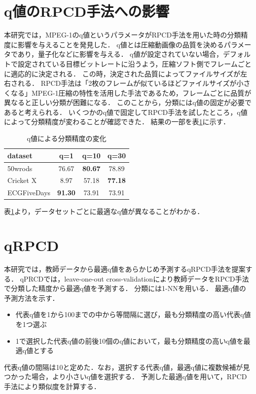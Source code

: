 \documentclass{interim} %
\begin{document}
\section{q値のRPCD手法への影響}
本研究では，MPEG-1のq値というパラメータがRPCD手法を用いた時の分類精度に影響を与えることを発見した．
q値とは圧縮動画像の品質を決めるパラメータであり，量子化などに影響を与える．
q値が設定されていない場合，デフォルトで設定されている目標ビットレートに沿うよう，圧縮ソフト側でフレームごとに適応的に決定される．
この時，決定された品質によってファイルサイズが左右される．
RPCD手法は「2枚のフレームが似ているほどファイルサイズが小さくなる」MPEG-1圧縮の特性を活用した手法であるため，フレームごとに品質が異なると正しい分類が困難になる．
このことから，分類にはq値の固定が必要であると考えられる．
いくつかのq値で固定してRPCD手法を試したところ，q値によって分類精度が変わることが確認できた．
結果の一部を表\ref{table:q}に示す．
\begin{table}[b]
	\centering
	\caption{q値による分類精度の変化}
	\label{table:q}
	\small
	\begin{tabular}{lccc}
		\hline
		dataset&q=1&q=10&q=30\\
		\hline
		\hline
		50wrods&76.67&\bf{80.67}&78.89\\
		Cricket X&8.97&57.18&\bf{77.18}\\
		ECGFiveDays&\bf{91.30}&73.91&73.91\\
		\hline
	\end{tabular}
\end{table}
表\ref{table:q}より，データセットごとに最適なq値が異なることがわかる．

\section{qRPCD}
本研究では，教師データから最適q値をあらかじめ予測するqRPCD手法を提案する．
qPRCDでは，leave-one-out cross-validationにより教師データをRPCD手法で分類した精度から最適q値を予測する．
分類には1-NNを用いる．
最適q値の予測方法を示す．

\begin{itemize} 
	\item[1] 代表q値を1から100までの中から等間隔に選び，最も分類精度の高い代表q値を1つ選ぶ
	\item[2] 1で選択した代表q値の前後10個のq値において，最も分類精度の高いq値を最適q値とする
\end{itemize}
代表q値の間隔は10と定めた．なお，選択する代表q値，最適q値に複数候補が見つかった場合，より小さいq値を選択する．
予測した最適q値を用いて，RPCD手法により類似度を計算する．
\end{document}
